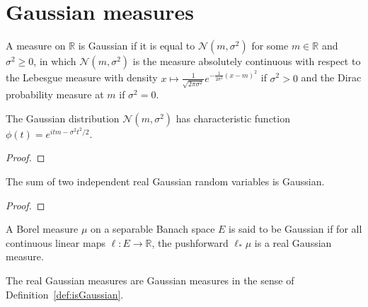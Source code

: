 \chapter{Gaussian measures}

\begin{definition}\label{def:gaussianReal}
\mathlibok
{}
A measure on $\mathbb{R}$ is Gaussian if it is equal to $\mathcal{N}(m, \sigma^2)$ for some $m \in \mathbb{R}$ and $\sigma^2 \ge 0$, in which $\mathcal{N}(m, \sigma^2)$ is the measure absolutely continuous with respect to the Lebesgue measure with density $x \mapsto \frac{1}{\sqrt{2 \pi \sigma^2}}e^{- \frac{1}{2\sigma^2}(x - m)^2}$ if $\sigma^2>0$ and the Dirac probability measure at $m$ if $\sigma^2 = 0$.
\end{definition}


\begin{lemma}\label{lem:gaussian_charFun}
\leanok
{}
The Gaussian distribution $\mathcal N(m, \sigma^2)$ has characteristic function $\phi(t) = e^{itm - \sigma^2 t^2 /2}$.
\end{lemma}

\begin{proof}\leanok
\end{proof}


\begin{lemma}\label{lem:add_gaussianReal}
The sum of two independent real Gaussian random variables is Gaussian.
\end{lemma}

\begin{proof}

\end{proof}


\begin{definition}\label{def:isGaussian}
A Borel measure $\mu$ on a separable Banach space $E$ is said to be Gaussian if for all continuous linear maps $\ell : E \to \mathbb{R}$, the pushforward $\ell_*\mu$ is a real Gaussian measure.
\end{definition}


\begin{lemma}\label{lem:isGaussian_gaussianReal}
The real Gaussian measures are Gaussian measures in the sense of Definition~\ref{def:isGaussian}.
\end{lemma}

